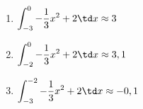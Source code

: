 \begin{Answer}[ref=integralGrafisch1]
\begin{enumerate}[label=\alph*)]
		\item \(\displaystyle\int_{-3}^{0} -\frac{1}{3}x^2+2\td x\approx 3\)
		\item \(\displaystyle\int_{-2}^{0} -\frac{1}{3}x^2+2\td x\approx 3,1\)
		\item \(\displaystyle\int_{-3}^{-2} -\frac{1}{3}x^2+2\td x\approx -0,1\)
	\end{enumerate}
\end{Answer}